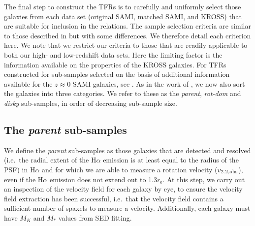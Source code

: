 \documentclass[a4paper,fleqn,usenatbib]{mnras}
\begin{document}
{The final step to construct the TFRs is to carefully and uniformly select those galaxies from each data set (original SAMI, matched SAMI, and KROSS) that are suitable for inclusion in the relations. The sample selection criteria are similar to those described in \citet{Tiley:2016} but with some differences. We therefore detail each criterion here. We note that we restrict our criteria to those that are readily applicable to both our high- and low-redshift data sets. Here the limiting factor is the information available on the properties of the KROSS galaxies. For TFRs constructed for sub-samples selected on the basis of additional information available for the $z\approx0$ SAMI galaxies, see \citet{Bloom:2017}. As in the work of \citet{Tiley:2016}, we now also sort the galaxies into three categories. We refer to these as the \textit{parent}, \textit{rot-dom} and \textit{disky} sub-samples, in order of decreasing sub-sample size. 

\subsection{The \textit{parent} sub-samples}
\label{subsec:parentsample}

We define the \textit{parent} sub-samples as those galaxies that are detected and resolved (i.e.\ the radial extent of the H$\alpha$ emission is at least equal to the radius of the PSF) in H$\alpha$ and for which we are able to measure a rotation velocity ($v_{2.2,\rm{obs}}$), even if the H$\alpha$ emission does not extend out to 1.3$r_{\text{e}}$. At this step, we carry out an inspection of the velocity field for each galaxy by eye, to ensure the velocity field extraction has been successful, i.e.\ that the velocity field contains a sufficient number of spaxels to measure a velocity. Additionally, each galaxy must have $M_{K}$ and $M_{*}$ values from SED fitting. 

}
\end{document}
